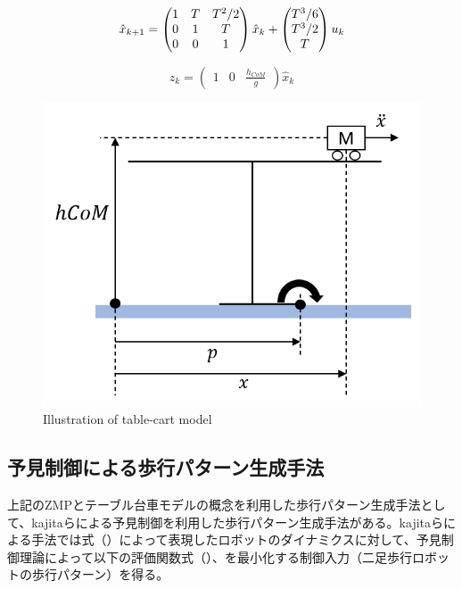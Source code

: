 \begin{equation}
  \hat{x}_{k+1}=
  \begin{pmatrix}
    1 & T & T^{2}/2\cr 0 & 1 & T\cr 0 & 0 & 1
  \end{pmatrix}
  \hat{x}_{k} +
  \begin{pmatrix}
    T^{3}/6 \\  T^{3}/2 \\ T
  \end{pmatrix}
  u_{k}
\end{equation}

\begin{equation}
  z_{k} =
  \begin{pmatrix}
    1 & 0 & \frac{h_{CoM}}{g}
  \end{pmatrix}
  \hat{x}_{k}
\end{equation}

\begin{figure}[hbtp]
  \centering
  \includegraphics[keepaspectratio, scale=0.6]
  {images/table_cart_hcom.png}
  \caption{Illustration of table-cart model }
  \label{Fig:tablecart}
\end{figure}



\newpage

\subsection{予見制御による歩行パターン生成手法}
上記のZMPとテーブル台車モデルの概念を利用した歩行パターン生成手法として、kajitaらによる予見制御を利用した歩行パターン生成手法\cite{PREVIEW}がある。kajitaらによる手法では式（）によって表現したロボットのダイナミクスに対して、予見制御理論によって以下の評価関数式（）、を最小化する制御入力（二足歩行ロボットの歩行パターン）を得る。

